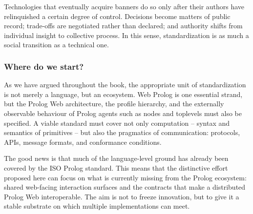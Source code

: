 Technologies that eventually acquire banners do so only after their authors have relinquished a certain degree of control. Decisions become matters of public record; trade-offs are negotiated rather than declared; and authority shifts from individual insight to collective process. In this sense, standardization is as much a social transition as a technical one.

\subsubsection{Where do we start?}\label{sec:where-to-start}

As we have argued throughout the book, the appropriate unit of standardization is not merely a language, but an ecosystem. Web Prolog is one essential strand, but the Prolog Web architecture, the profile hierarchy, and the externally observable behaviour of Prolog agents such as nodes and toplevels must also be specified. A viable standard must cover not only computation -- syntax and semantics of primitives -- but also the pragmatics of communication: protocols, APIs, message formats, and conformance conditions.

The good news is that much of the language-level ground has already been covered by the ISO Prolog standard. This means that the distinctive effort proposed here can focus on what is currently missing from the Prolog ecosystem: shared web-facing interaction surfaces and the contracts that make a distributed Prolog Web interoperable. The aim is not to freeze innovation, but to give it a stable substrate on which multiple implementations can meet.

